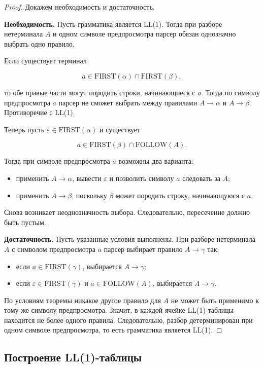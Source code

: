 \documentclass[12pt,a4paper]{article}
\begin{document}
\begin{proof}
Докажем необходимость и достаточность.

\textbf{Необходимость.}
Пусть грамматика является LL(1). Тогда при разборе нетерминала $A$ и одном символе предпросмотра парсер обязан однозначно выбрать одно правило.

Если существует терминал

\[
a \in \mathrm{FIRST}(\alpha)\cap \mathrm{FIRST}(\beta),
\]

то обе правые части могут породить строки, начинающиеся с $a$. Тогда по символу предпросмотра $a$ парсер не сможет выбрать между правилами $A \to \alpha$ и $A \to \beta$. Противоречие с LL(1).

Теперь пусть $\varepsilon \in \mathrm{FIRST}(\alpha)$ и существует

\[
a \in \mathrm{FIRST}(\beta)\cap \mathrm{FOLLOW}(A).
\]

Тогда при символе предпросмотра $a$ возможны два варианта:
\begin{itemize}
    \item применить $A \to \alpha$, вывести $\varepsilon$ и позволить символу $a$ следовать за $A$;
    \item применить $A \to \beta$, поскольку $\beta$ может породить строку, начинающуюся с $a$.
\end{itemize}

Снова возникает неоднозначность выбора. Следовательно, пересечение должно быть пустым.

\textbf{Достаточность.}
Пусть указанные условия выполнены. При разборе нетерминала $A$ с символом предпросмотра $a$ парсер выбирает правило $A \to \gamma$ так:
\begin{itemize}
    \item если $a \in \mathrm{FIRST}(\gamma)$, выбирается $A \to \gamma$;
    \item если $\varepsilon \in \mathrm{FIRST}(\gamma)$ и $a \in \mathrm{FOLLOW}(A)$, выбирается $A \to \gamma$.
\end{itemize}

По условиям теоремы никакое другое правило для $A$ не может быть применимо к тому же символу предпросмотра. Значит, в каждой ячейке LL(1)-таблицы находится не более одного правила. Следовательно, разбор детерминирован при одном символе предпросмотра, то есть грамматика является LL(1).
\end{proof}

\subsection{Построение LL(1)-таблицы}
\end{document}
